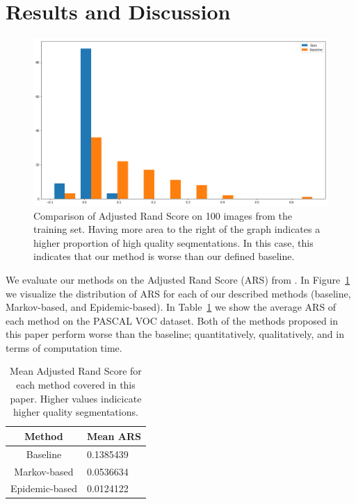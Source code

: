 \documentclass[twocolumn]{article}
\newcommand{\seclab}[1]{\label{sec:#1}}
\newcommand{\figref}[1]{Figure~\ref{fig:#1}}
\newcommand{\figlab}[1]{\label{fig:#1}}
\newcommand{\tblref}[1]{Table~\ref{tbl:#1}}
\newcommand{\tbllab}[1]{\label{tbl:#1}}
\begin{document}
\section{Results and Discussion}\seclab{results}

\begin{figure}[t]
  \centering
  \includegraphics[width=\linewidth]{figs/bars.png}
  \caption{Comparison of Adjusted Rand Score on 100 images from the training
  set. Having more area to the right of the graph indicates a higher proportion
  of high quality seqmentations. In this case, this indicates that our method is
  worse than our defined baseline.
  }
  \figlab{bars}
\end{figure}

We evaluate our methods on the Adjusted Rand Score (ARS) from
\cite{unnikrishnan2005measure}. In \figref{bars} we visualize the distribution
of ARS for each of our described methods (baseline, Markov-based, and
Epidemic-based). In \tblref{ars} we show the average ARS of each method on the
PASCAL VOC dataset. Both of the methods proposed in this paper perform worse
than the baseline; quantitatively, qualitatively, and in terms of computation
time.

\begin{table}
    \centering
    \caption{Mean Adjusted Rand Score for each method covered in this paper.
    Higher values indicicate higher quality segmentations.}
    \tbllab{ars}

    \begin{tabular}{c|l}
        Method & Mean ARS \\ \hline
        Baseline & 0.1385439 \\
        Markov-based & 0.0536634 \\
        Epidemic-based & 0.0124122
    \end{tabular}
\end{table}
\end{document}
